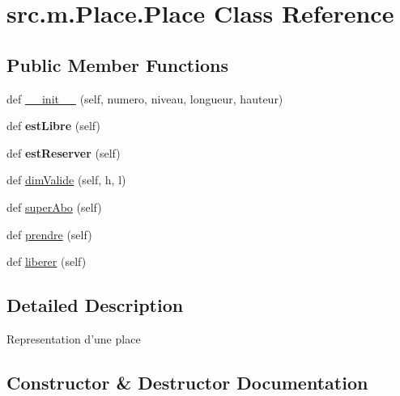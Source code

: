 \hypertarget{classsrc_1_1m_1_1_place_1_1_place}{}\section{src.\+m.\+Place.\+Place Class Reference}
\label{classsrc_1_1m_1_1_place_1_1_place}
\subsection*{Public Member Functions}
\begin{DoxyCompactItemize}
\item 
def \hyperlink{classsrc_1_1m_1_1_place_1_1_place_ae0a8d8ba7d7430493b0a632179bbdd9c}{\+\_\+\+\_\+init\+\_\+\+\_\+} (self, numero, niveau, longueur, hauteur)
\item 
\hypertarget{classsrc_1_1m_1_1_place_1_1_place_af56ac12fa475fd17f857a966f8caf264}{}def {\bfseries est\+Libre} (self)\label{classsrc_1_1m_1_1_place_1_1_place_af56ac12fa475fd17f857a966f8caf264}

\item 
\hypertarget{classsrc_1_1m_1_1_place_1_1_place_a0ce70e270d94242bb25a6852b9661723}{}def {\bfseries est\+Reserver} (self)\label{classsrc_1_1m_1_1_place_1_1_place_a0ce70e270d94242bb25a6852b9661723}

\item 
def \hyperlink{classsrc_1_1m_1_1_place_1_1_place_aec4a76151d65f47b656d22df1ef30cfd}{dim\+Valide} (self, h, l)
\item 
def \hyperlink{classsrc_1_1m_1_1_place_1_1_place_ae0d93eb71609d18b96c77897c2fb8008}{super\+Abo} (self)
\item 
def \hyperlink{classsrc_1_1m_1_1_place_1_1_place_ada865ecc4a9bc7d8fe4db843ac9a3e74}{prendre} (self)
\item 
def \hyperlink{classsrc_1_1m_1_1_place_1_1_place_a73f06c88139ef54dabc0e614f9e4c018}{liberer} (self)
\end{DoxyCompactItemize}


\subsection{Detailed Description}
\begin{DoxyVerb}Representation d'une place
\end{DoxyVerb}
 

\subsection{Constructor \& Destructor Documentation}
\hypertarget{classsrc_1_1m_1_1_place_1_1_place_ae0a8d8ba7d7430493b0a632179bbdd9c}{}

